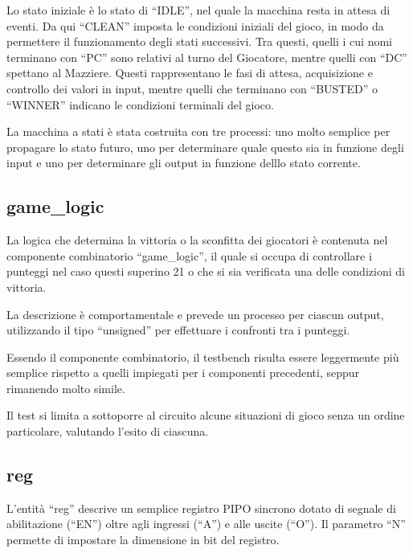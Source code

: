\documentclass [11pt,a4paper,oneside]{article}
\begin{document}
Lo stato iniziale è lo stato di ``IDLE'', nel quale la macchina resta
in attesa di eventi. Da qui ``CLEAN'' imposta le condizioni iniziali
del gioco, in modo da permettere il funzionamento degli stati successivi.
Tra questi, quelli i cui nomi
terminano con ``PC'' sono relativi al turno del Giocatore, mentre 
quelli con ``DC'' spettano al Mazziere. Questi rappresentano le fasi
di attesa, acquisizione e controllo dei valori in input, mentre quelli
che terminano con ``BUSTED'' o ``WINNER'' indicano le condizioni 
terminali del gioco.



La macchina a stati è stata costruita con tre processi: uno molto 
semplice per propagare lo stato futuro, uno per determinare quale
questo sia in funzione degli input e uno per determinare gli output
in funzione delllo stato corrente.



\subsection{game\_logic}

La logica che determina la vittoria o la sconfitta dei giocatori è
contenuta nel componente combinatorio ``game\_logic'', il quale
si occupa di controllare i punteggi nel caso questi superino 21 o
che si sia verificata una delle condizioni di vittoria.



La descrizione è comportamentale e prevede un processo per ciascun
output, utilizzando il tipo ``unsigned'' per effettuare i confronti
tra i punteggi.



Essendo il componente combinatorio, il testbench risulta essere
leggermente più semplice rispetto a quelli impiegati per i componenti
precedenti, seppur rimanendo molto simile.



Il test si limita a sottoporre al circuito alcune situazioni di 
gioco senza un ordine particolare, valutando l'esito di ciascuna.

\subsection{reg}

L'entità ``reg'' descrive un semplice registro PIPO sincrono dotato di 
segnale di abilitazione (``EN'') oltre agli ingressi (``A'') e alle
uscite (``O''). Il parametro ``N'' permette di impostare la dimensione
in bit del registro.
\end{document}
